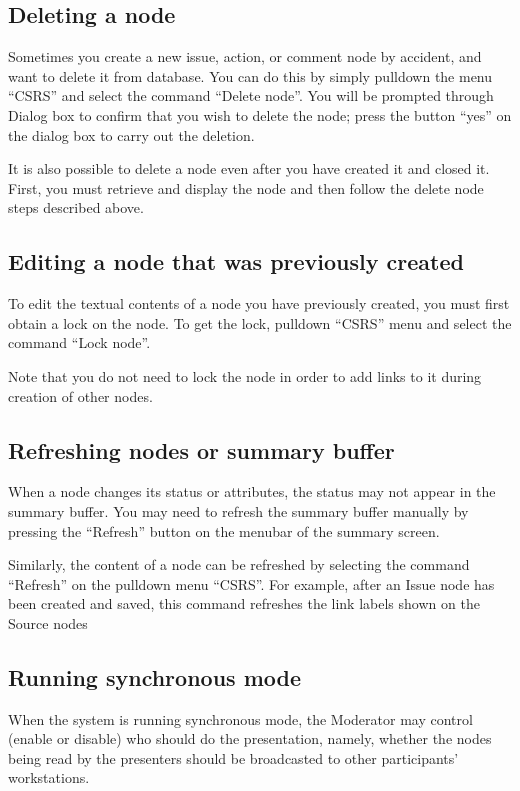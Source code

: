 \subsection {Deleting a node}
Sometimes you create a new issue, action, or comment node by accident,
and want to delete it from database. You can do this by simply
pulldown the menu ``CSRS'' and select the command ``Delete node''.
You will be prompted through Dialog box to confirm that you wish to
delete the node; press the button ``yes'' on the dialog box to carry
out the deletion. 

It is also possible to delete a node even after you have created it
and closed it. First, you must retrieve and display the node and then
follow the delete node steps described above.

\subsection {Editing a node that was previously created}
To edit the textual contents of a node you have previously created,
you must first obtain a lock on the node. To get the lock, pulldown
``CSRS'' menu and select the command ``Lock node''.

Note that you do not need to lock the node in order to add links to it
during creation of other nodes.

\subsection {Refreshing nodes or summary buffer}

When a node changes its status or attributes, the status may not
appear in the summary buffer. You may need to refresh the summary buffer
manually by pressing the ``Refresh'' button on the 
menubar of the summary screen.

Similarly, the content of a node can be refreshed by selecting the
command ``Refresh'' on the pulldown menu ``CSRS''. 
For example, after an Issue node has been created and saved, this command 
refreshes the link labels shown on the Source nodes 


\subsection {Running synchronous mode}
When the system is running synchronous mode, the Moderator may control
(enable or disable) who should do the presentation, namely, whether the
nodes being read by the presenters should be broadcasted to other
participants' workstations.

